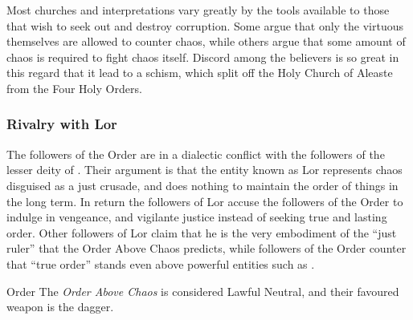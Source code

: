 Most churches and interpretations vary greatly by the tools available to those
that wish to seek out and destroy corruption. Some argue that only the virtuous
themselves are allowed to counter chaos, while others argue that some amount of
chaos is required to fight chaos itself. Discord among the believers is so
great in this regard that it lead to a schism, which split off the Holy Church
of Aleaste from the Four Holy Orders.

\subsubsection{Rivalry with Lor}

The followers of the Order are in a dialectic conflict with the followers of
the lesser deity of . Their argument is that the entity known
as Lor represents chaos disguised as a just crusade, and does nothing to
maintain the order of things in the long term. In return the followers of Lor
accuse the followers of the Order to indulge in vengeance, and vigilante
justice instead of seeking true and lasting order. Other followers of Lor
claim that he is the very embodiment of the ``just ruler'' that the Order
Above Chaos predicts, while followers of the Order counter that ``true order''
stands even above powerful entities such as .

\begin{35e}{Order}
  The \emph{Order Above Chaos} is considered Lawful Neutral, and their favoured
  weapon is the dagger.
\end{35e}
